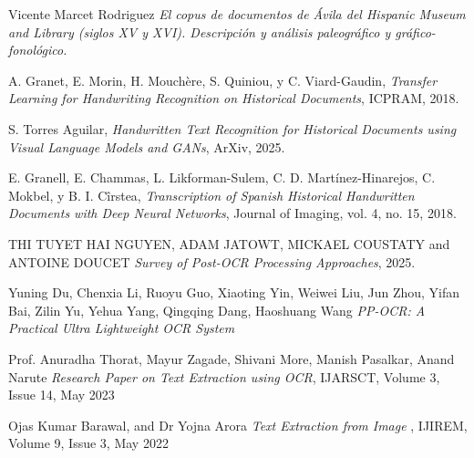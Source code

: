 \documentclass[11pt,a4paper]{article}
\begin{document}
\begin{thebibliography}{9}

    Vicente Marcet Rodriguez
    \textit{El copus de documentos de \'Avila del Hispanic Museum and Library (siglos XV y XVI). Descripci\'on y an\'alisis paleogr\'afico y gr\'afico-fonol\'ogico.}

    A. Granet, E. Morin, H. Mouchère, S. Quiniou, y C. Viard-Gaudin, 
    \textit{Transfer Learning for Handwriting Recognition on Historical Documents}, 
    ICPRAM, 2018.
    
    S. Torres Aguilar, 
    \textit{Handwritten Text Recognition for Historical Documents using Visual Language Models and GANs}, 
    ArXiv, 2025.
    
    E. Granell, E. Chammas, L. Likforman-Sulem, C. D. Martínez-Hinarejos, C. Mokbel, y B. I. Cîrstea, 
    \textit{Transcription of Spanish Historical Handwritten Documents with Deep Neural Networks}, 
    Journal of Imaging, vol. 4, no. 15, 2018.
    
    THI TUYET HAI NGUYEN, ADAM JATOWT, MICKAEL COUSTATY and ANTOINE DOUCET
    \textit{Survey of Post-OCR Processing Approaches}, 
    2025.

    Yuning Du, Chenxia Li, Ruoyu Guo, Xiaoting Yin, Weiwei Liu,
Jun Zhou, Yifan Bai, Zilin Yu, Yehua Yang, Qingqing Dang, Haoshuang Wang
    \textit{PP-OCR: A Practical Ultra Lightweight OCR System}
    
    Prof. Anuradha Thorat, Mayur Zagade, Shivani More, Manish Pasalkar, Anand Narute
    \textit{Research Paper on Text Extraction using OCR}, 
    IJARSCT, Volume 3, Issue 14, May 2023

    Ojas Kumar Barawal, and Dr Yojna Arora
    \textit{Text Extraction from Image }, 
    IJIREM, Volume 9, Issue 3, May 2022

\end{thebibliography}
\end{document}
